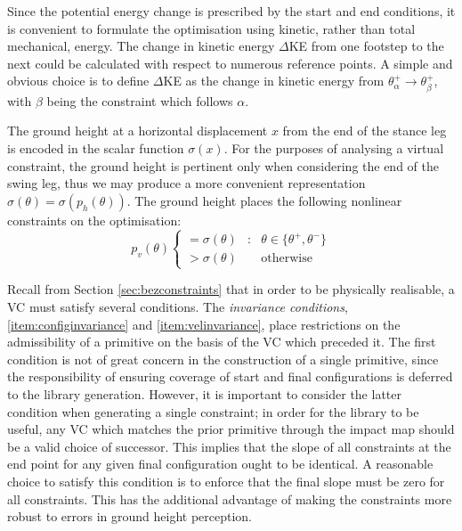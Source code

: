 Since the potential energy change is prescribed by the start and end conditions, it is convenient to formulate the optimisation using kinetic, rather than total mechanical, energy. The change in kinetic energy $\Delta$KE from one footstep to the next could be calculated with respect to numerous reference points. A simple and obvious choice is to define $\Delta$KE as the change in kinetic energy from $\theta_\alpha^+ \rightarrow \theta_\beta^+$, with $\beta$ being the constraint which follows $\alpha$.

The ground height at a horizontal displacement $x$ from the end of the stance leg is encoded in the scalar function $\sigma(x)$. For the purposes of analysing a virtual constraint, the ground height is pertinent only when considering the end of the swing leg, thus we may produce a more convenient representation $\sigma(\theta)=\sigma(p_h(\theta))$. The ground height places the following nonlinear constraints on the optimisation:
\begin{equation} \label{eqn:groundheight}
	p_v(\theta) \left\{
	\begin{array}{lcr}
		= \sigma(\theta) &:& \theta \in \{\theta^+, \theta^-\} \\
		> \sigma(\theta) &~& \mathrm{otherwise}
	\end{array} \right.
\end{equation}

Recall from Section \ref{sec:bezconstraints} that in order to be physically realisable, a VC must satisfy several conditions. The \textit{invariance conditions}, \ref{item:configinvariance} and \ref{item:velinvariance}, place restrictions on the admissibility of a primitive on the basis of the VC which preceded it. The first condition is not of great concern in the construction of a single primitive, since the responsibility of ensuring coverage of start and final configurations is deferred to the library generation. However, it is important to consider the latter condition when generating a single constraint; in order for the library to be useful, any VC which matches the prior primitive through the impact map should be a valid choice of successor. This implies that the slope of all constraints at the end point for any given final configuration ought to be identical. A reasonable choice to satisfy this condition is to enforce that the final slope must be zero for all constraints. This has the additional advantage of making the constraints more robust to errors in ground height perception.

